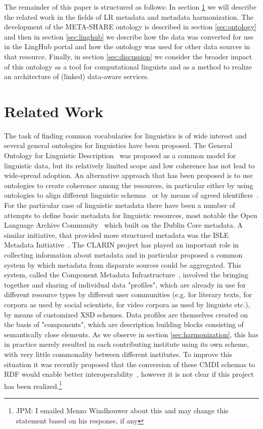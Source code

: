 \documentclass{llncs}
\begin{document}
The remainder of this paper is structured as follows: In section
\ref{sec:relatedwork} we will describe the related work in the fields of
LR metadata and metadata harmonization. The development of the
META-SHARE ontology is described in section \ref{sec:ontology} and then in
section \ref{sec:linghub} we describe how the data was converted for use in the
LingHub portal and how the ontology was used for other data sources in that
resource. Finally, in section \ref{sec:discussion} we consider the broader
impact of this ontology as a tool for computational linguists and as a method to
realize an architecture of (linked) data-aware services.

\section{Related Work}

\label{sec:relatedwork}

The task of finding common vocabularies for linguistics is of wide interest and
several general ontologies for linguistics have been proposed. The General
Ontology for Linguistic Description~\cite[GOLD]{farrar2002common} was proposed
as a common model for linguistic data, but its relatively limited scope and low
coherence has not lead to wide-spread adoption. An alternative approach that has
been proposed is to use ontologies to create coherence among the resources, in
particular either by using ontologies to align different linguistic
schemas~\cite{chiarcos2012ontologies} or by means of agreed
identifiers~\cite{kemps2008isocat}. For the particular case of linguistic
metadata there have been a number of attempts to define basic metadata for
linguistic resources, most notable the Open Language Archive
Community~\cite[OLAC]{bird2001olac} which built on the Dublin Core metadata. A
similar initiative, that provided more structured metadata was the ISLE Metadata
Initiative~\cite[IMDI]{broeder2001imdi}.
The CLARIN project has played an important role in collecting information about
metadata and in particular proposed a common system by which metadata from
disparate sources could be aggregated. This system, called the Component
Metadata Infrastructure~\cite{broeder2012cmdi}, involved the bringing together and sharing of
individual data "profiles", which are already in use for different resource types by different user communities (e.g. for literary texts, for corpora as used by social scientists, for video corpora as used by linguists etc.), by means of customized XSD schemes. Data profiles are themselves created on the basis of "components", which are description building blocks consisting of semantically close elements.
As we observe in section \ref{sec:harmonization}, this has in practice merely
resulted in each contributing institute using its own scheme, with very little
commonality between different institutes. To improve this situation it was
recently proposed that the conversion of these CMDI schemas to RDF would enable
better interoperability~\cite{durco2014clarin}, however it is not clear if this
project has been realized.\footnote{JPM: I emailed Menzo Windhouwer about this
and may change this statement based on his response, if any}
\end{document}
